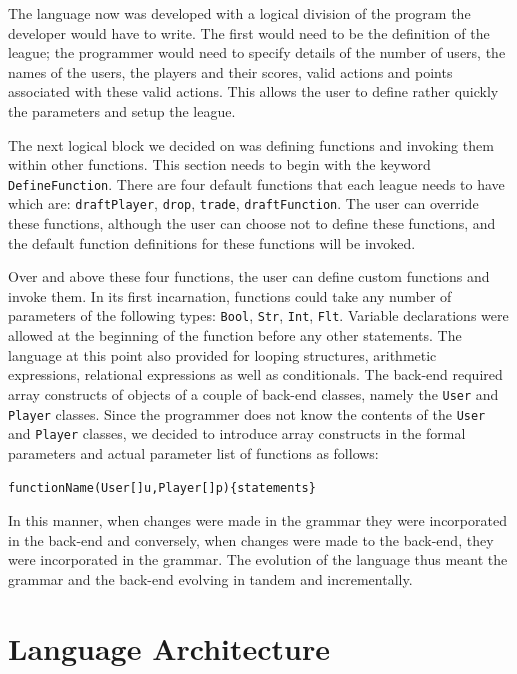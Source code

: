 \documentclass[12pt]{report}
\begin{document}
The language now was developed with a logical division of the program the developer would have to write. The first would need to be the definition of the league; the programmer would need to specify details of the number of users, the names of the users, the players and their scores, valid actions and points associated with these valid actions. This allows the user to define rather quickly the parameters and setup the league.

The next logical block we decided on was defining functions and invoking them within other functions. This section needs to begin with the keyword \texttt{DefineFunction}. There are four default functions that each league needs to have which are: \texttt{draftPlayer}, \texttt{drop}, \texttt{trade}, \texttt{draftFunction}. The user can override these functions, although the user can choose not to define these functions, and the default function definitions for these functions will be invoked. 

Over and above these four functions, the user can define custom functions and invoke them. In its first incarnation, functions could take any number of parameters of the following types: \texttt{Bool}, \texttt{Str}, \texttt{Int}, \texttt{Flt}. Variable declarations were allowed at the beginning of the function before any other statements. The language at this point also provided for looping structures, arithmetic expressions, relational expressions as well as conditionals. The back-end required array constructs of objects of a couple of back-end classes, namely the \texttt{User} and \texttt{Player} classes. Since the programmer does not know the contents of the \texttt{User} and \texttt{Player} classes, we decided to introduce array constructs in the formal parameters and actual parameter list of functions as follows:

\begin{alltt}\begin{singlespace}
         functionName(User[] u,Player[] p) \{ statements \}\end{singlespace}
\end{alltt}

In this manner, when changes were made in the grammar they were incorporated in the back-end and conversely, when changes were made to the back-end, they were incorporated in the grammar. The evolution of the language thus meant the grammar and the back-end evolving in tandem and incrementally.

\chapter{Language Architecture}
\end{document}
